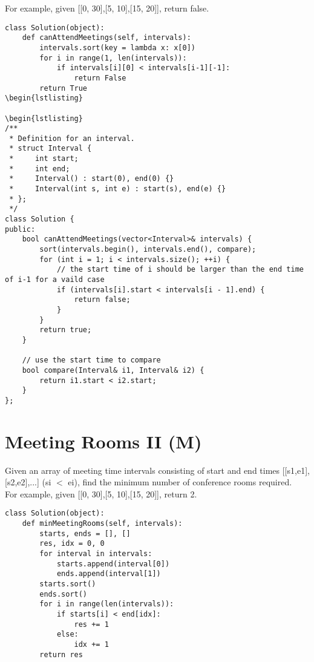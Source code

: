For example, given [[0, 30],[5, 10],[15, 20]], return false.\\

\begin{lstlisting}
class Solution(object):
    def canAttendMeetings(self, intervals):
        intervals.sort(key = lambda x: x[0])
        for i in range(1, len(intervals)):
            if intervals[i][0] < intervals[i-1][-1]:
                return False
        return True
\begin{lstlisting}

\begin{lstlisting}
/** 
 * Definition for an interval. 
 * struct Interval { 
 *     int start; 
 *     int end; 
 *     Interval() : start(0), end(0) {} 
 *     Interval(int s, int e) : start(s), end(e) {} 
 * }; 
 */
class Solution {
public:
    bool canAttendMeetings(vector<Interval>& intervals) {
        sort(intervals.begin(), intervals.end(), compare);
        for (int i = 1; i < intervals.size(); ++i) {
            // the start time of i should be larger than the end time of i-1 for a vaild case
            if (intervals[i].start < intervals[i - 1].end) {
                return false;
            }
        }
        return true;
    }
    
    // use the start time to compare
    bool compare(Interval& i1, Interval& i2) {
        return i1.start < i2.start;
    }
};
\end{lstlisting}


\section{Meeting Rooms II (M)}
Given an array of meeting time intervals consisting of start and end times [[s1,e1],[s2,e2],...] (si $<$ ei), find the minimum number of conference rooms required.\\

For example, given [[0, 30],[5, 10],[15, 20]], return 2.\\

\begin{lstlisting}
class Solution(object):
	def minMeetingRooms(self, intervals):
		starts, ends = [], []
		res, idx = 0, 0
		for interval in intervals:
			starts.append(interval[0])
			ends.append(interval[1])
		starts.sort()
		ends.sort()
		for i in range(len(intervals)):
			if starts[i] < end[idx]:
				res += 1
			else:
				idx += 1
		return res
\end{lstlisting}

